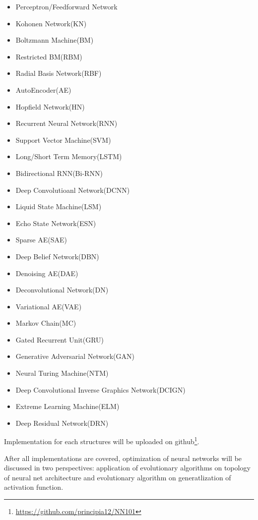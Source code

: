 \begin{itemize} 
\item Perceptron/Feedforward Network \cite{perceptron} 
\item Kohonen Network(KN) \cite{KN}
\item Boltzmann Machine(BM) \cite{BM}
\item Restricted BM(RBM) \cite{RBM}
\item Radial Basis Network(RBF) \cite{RBF}
\item AutoEncoder(AE) \cite{AE}
\item Hopfield Network(HN) \cite{HN}
\item Recurrent Neural Network(RNN) \cite{RNN}
\item Support Vector Machine(SVM) \cite{SVM}
\item Long/Short Term Memory(LSTM) \cite{LSTM}
\item Bidirectional RNN(Bi-RNN) \cite{Bi-RNN}
\item Deep Convolutioanl Network(DCNN) \cite{DCNN}
\item Liquid State Machine(LSM) \cite{LSM}
\item Echo State Network(ESN) \cite{ESN}
\item Sparse AE(SAE) \cite{SAE}
\item Deep Belief Network(DBN) \cite{DBN}
\item Denoising AE(DAE) \cite{DAE}
\item Deconvolutional Network(DN) \cite{DN}
\item Variational AE(VAE) \cite{VAE}
\item Markov Chain(MC) \cite{MC}
\item Gated Recurrent Unit(GRU) \cite{GRU}
\item Generative Adversarial Network(GAN) \cite{GAN}
\item Neural Turing Machine(NTM) \cite{NTM}
\item Deep Convolutional Inverse Graphics Network(DCIGN) \cite{DCIGN}
\item Extreme Learning Machine(ELM) \cite{ELM}
\item Deep Residual Network(DRN) \cite{DRN}
\end{itemize}

Implementation for each structures will be uploaded on github\footnote{\href{https://github.com/principia12/NN101}{https://github.com/principia12/NN101}}.

After all implementations are covered, optimization of neural networks will be discussed in two perspectives: application of evolutionary algorithms on topology of neural net architecture and evolutionary algorithm on generatlization of activation function. 
